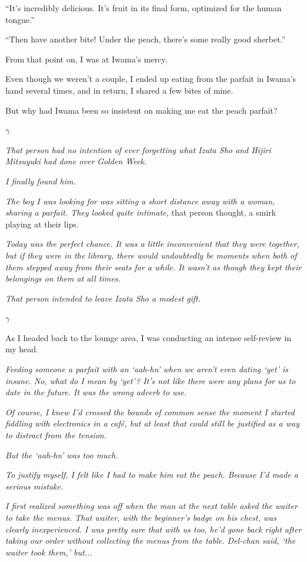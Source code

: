 \documentclass[
    a4paper,
    12pt,
    twoside,
    openany,
    UTF8,
    fontset=windows
]{ctexbook}
\begin{document}
``It's incredibly delicious. It's fruit in its final form, optimized for the human tongue.''

``Then have another bite! Under the peach, there's some really good sherbet.''

From that point on, I was at Iwama's mercy.

Even though we weren't a couple, I ended up eating from the parfait in Iwama's hand several times, and in return, I shared a few bites of mine.

But why had Iwama been so insistent on making me eat the peach parfait?

$\gamma$

\textit{That person had no intention of ever forgetting what Izuta Sho and Hijiri Mitsuyuki had done over Golden Week.}

\textit{I finally found him.}

\textit{The boy I was looking for was sitting a short distance away with a woman, sharing a parfait. They looked quite intimate,} that person thought, a smirk playing at their lips.

\textit{Today was the perfect chance. It was a little inconvenient that they were together, but if they were in the library, there would undoubtedly be moments when both of them stepped away from their seats for a while. It wasn't as though they kept their belongings on them at all times.}

\textit{That person intended to leave Izuta Sho a modest gift.}

$\gamma$

As I headed back to the lounge area, I was conducting an intense self-review in my head.

\textit{Feeding someone a parfait with an `aah-hn' when we aren't even dating `yet' is insane. No, what do I mean by `yet'? It's not like there were any plans for us to date in the future. It was the wrong adverb to use.}

\textit{Of course, I knew I'd crossed the bounds of common sense the moment I started fiddling with electronics in a café, but at least that could still be justified as a way to distract from the tension.}

\textit{But the `aah-hn' was too much.}

\textit{To justify myself, I felt like I had to make him eat the peach. Because I'd made a serious mistake.}

\textit{I first realized something was off when the man at the next table asked the waiter to take the menus. That waiter, with the beginner's badge on his chest, was clearly inexperienced. I was pretty sure that with us too, he'd gone back right after taking our order without collecting the menus from the table. Del-chan said, `the waiter took them,' but...}
\end{document}
